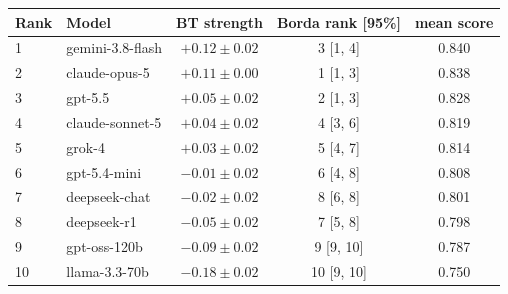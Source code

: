 \begin{tabular}{llccc}
\toprule
Rank & Model & BT strength & Borda rank [95\%] & mean score \\
\midrule
1 & gemini-3.8-flash & $+0.12 \pm 0.02$ & 3 [1, 4] & 0.840 \\
2 & claude-opus-5 & $+0.11 \pm 0.00$ & 1 [1, 3] & 0.838 \\
3 & gpt-5.5 & $+0.05 \pm 0.02$ & 2 [1, 3] & 0.828 \\
4 & claude-sonnet-5 & $+0.04 \pm 0.02$ & 4 [3, 6] & 0.819 \\
5 & grok-4 & $+0.03 \pm 0.02$ & 5 [4, 7] & 0.814 \\
6 & gpt-5.4-mini & $-0.01 \pm 0.02$ & 6 [4, 8] & 0.808 \\
7 & deepseek-chat & $-0.02 \pm 0.02$ & 8 [6, 8] & 0.801 \\
8 & deepseek-r1 & $-0.05 \pm 0.02$ & 7 [5, 8] & 0.798 \\
9 & gpt-oss-120b & $-0.09 \pm 0.02$ & 9 [9, 10] & 0.787 \\
10 & llama-3.3-70b & $-0.18 \pm 0.02$ & 10 [9, 10] & 0.750 \\
\bottomrule
\end{tabular}
